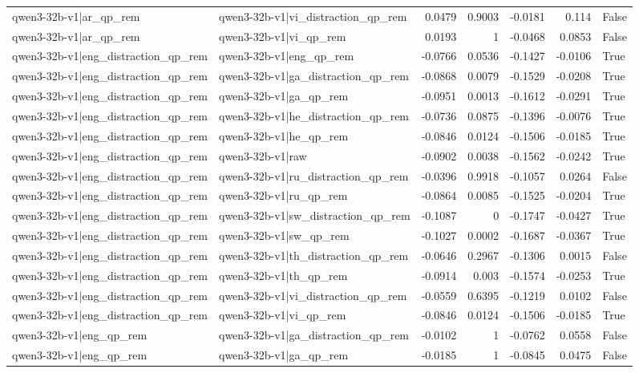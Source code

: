 \begin{table}
\begin{tabular}{l l r r r r l}
qwen3-32b-v1|ar_qp_rem & qwen3-32b-v1|vi_distraction_qp_rem & 0.0479 & 0.9003 & -0.0181 & 0.114 & False \\
qwen3-32b-v1|ar_qp_rem & qwen3-32b-v1|vi_qp_rem & 0.0193 & 1 & -0.0468 & 0.0853 & False \\
qwen3-32b-v1|eng_distraction_qp_rem & qwen3-32b-v1|eng_qp_rem & -0.0766 & 0.0536 & -0.1427 & -0.0106 & True \\
qwen3-32b-v1|eng_distraction_qp_rem & qwen3-32b-v1|ga_distraction_qp_rem & -0.0868 & 0.0079 & -0.1529 & -0.0208 & True \\
qwen3-32b-v1|eng_distraction_qp_rem & qwen3-32b-v1|ga_qp_rem & -0.0951 & 0.0013 & -0.1612 & -0.0291 & True \\
qwen3-32b-v1|eng_distraction_qp_rem & qwen3-32b-v1|he_distraction_qp_rem & -0.0736 & 0.0875 & -0.1396 & -0.0076 & True \\
qwen3-32b-v1|eng_distraction_qp_rem & qwen3-32b-v1|he_qp_rem & -0.0846 & 0.0124 & -0.1506 & -0.0185 & True \\
qwen3-32b-v1|eng_distraction_qp_rem & qwen3-32b-v1|raw & -0.0902 & 0.0038 & -0.1562 & -0.0242 & True \\
qwen3-32b-v1|eng_distraction_qp_rem & qwen3-32b-v1|ru_distraction_qp_rem & -0.0396 & 0.9918 & -0.1057 & 0.0264 & False \\
qwen3-32b-v1|eng_distraction_qp_rem & qwen3-32b-v1|ru_qp_rem & -0.0864 & 0.0085 & -0.1525 & -0.0204 & True \\
qwen3-32b-v1|eng_distraction_qp_rem & qwen3-32b-v1|sw_distraction_qp_rem & -0.1087 & 0 & -0.1747 & -0.0427 & True \\
qwen3-32b-v1|eng_distraction_qp_rem & qwen3-32b-v1|sw_qp_rem & -0.1027 & 0.0002 & -0.1687 & -0.0367 & True \\
qwen3-32b-v1|eng_distraction_qp_rem & qwen3-32b-v1|th_distraction_qp_rem & -0.0646 & 0.2967 & -0.1306 & 0.0015 & False \\
qwen3-32b-v1|eng_distraction_qp_rem & qwen3-32b-v1|th_qp_rem & -0.0914 & 0.003 & -0.1574 & -0.0253 & True \\
qwen3-32b-v1|eng_distraction_qp_rem & qwen3-32b-v1|vi_distraction_qp_rem & -0.0559 & 0.6395 & -0.1219 & 0.0102 & False \\
qwen3-32b-v1|eng_distraction_qp_rem & qwen3-32b-v1|vi_qp_rem & -0.0846 & 0.0124 & -0.1506 & -0.0185 & True \\
qwen3-32b-v1|eng_qp_rem & qwen3-32b-v1|ga_distraction_qp_rem & -0.0102 & 1 & -0.0762 & 0.0558 & False \\
qwen3-32b-v1|eng_qp_rem & qwen3-32b-v1|ga_qp_rem & -0.0185 & 1 & -0.0845 & 0.0475 & False \\

\end{tabular}
\end{table}
